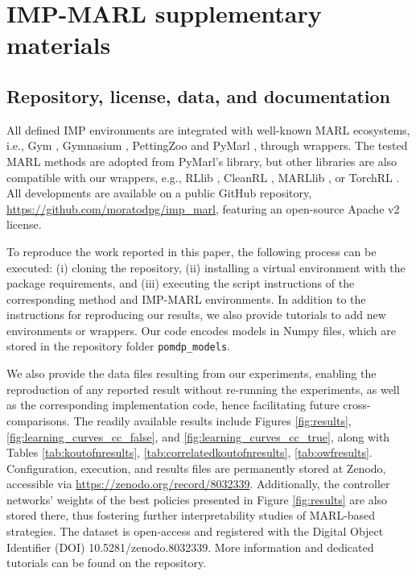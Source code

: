 \chapter{IMP-MARL supplementary materials} \label{ch:ch5_appendix}
\section{Repository, license, data, and documentation}
\label{sec:ch5_appendix_imp_public_repo}

All defined IMP environments are integrated with well-known MARL ecosystems, i.e., Gym \citep{openaigym}, Gymnasium \citep{towers_gymnasium_2023}, PettingZoo \citep{terry2021pettingzoo} and PyMarl \citep{samvelyan2019starcraft}, through wrappers.
The tested MARL methods are adopted from PyMarl's library, but other libraries are also compatible with our wrappers, e.g., RLlib \citep{liang2018rllib}, CleanRL \citep{huang2022cleanrl}, MARLlib \citep{hu2022marllib}, or TorchRL \citep{bou2023torchrl}.
All developments are available on a public GitHub repository, \url{https://github.com/moratodpg/imp\_marl}, featuring an open-source Apache v2 license.

To reproduce the work reported in this paper, the following process can be executed: (i) cloning the repository, (ii) installing a virtual environment with the package requirements, and (iii) executing the script instructions of the corresponding method and IMP-MARL environments.
In addition to the instructions for reproducing our results, we also provide tutorials to add new environments or wrappers.
Our code encodes models in Numpy files, which are stored in the repository folder \texttt{pomdp\_models}.

We also provide the data files resulting from our experiments, enabling the reproduction of any reported result without re-running the experiments, as well as the corresponding implementation code, hence facilitating future cross-comparisons.
The readily available results include Figures \ref{fig:results}, \ref{fig:learning_curves_cc_false}, and \ref{fig:learning_curves_cc_true}, along with Tables \ref{tab:koutofnresults}, \ref{tab:correlatedkoutofnresults}, \ref{tab:owfresults}.
Configuration, execution, and results files are permanently stored at Zenodo, accessible via \url{https://zenodo.org/record/8032339}. 
Additionally, the controller networks' weights of the best policies presented in Figure \ref{fig:results} are also stored there, thus fostering further interpretability studies of MARL-based strategies.
The dataset is open-access and registered with the Digital Object Identifier (DOI) 10.5281/zenodo.8032339.
More information and dedicated tutorials can be found on the repository.

